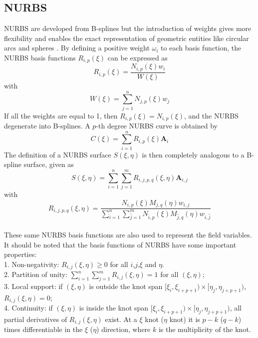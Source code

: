 \documentclass[review]{elsarticle}
\begin{document}
\subsection{NURBS}
NURBS are developed from B-splines but the introduction of weights gives more flexibility and enables the exact representation of geometric entities like circular arcs and spheres \cite{Piegl}. By defining a positive weight $\omega_i$ to each basis function, the NURBS basis functions $R_{i,p}(\xi)$ can be expressed as
\begin{equation}
R_{i,p}(\xi)=\frac{N_{i,p}(\xi)w_i}{W(\xi)} 
\end{equation}
with
\begin{equation}
W(\xi)=\sum_{j=1}^{n}N_{j,p}(\xi)w_j
\end{equation}
If all the weights are equal to 1, then $R_{i,p}(\xi)=N_{i,p}(\xi)$, and the NURBS degenerate into B-splines. A $p$-th degree NURBS curve is obtained by
\begin{equation}
C(\xi)=\sum_{i=1}^{n}R_{i,p}(\xi)\mathbf{A}_i
\end{equation}
The definition of a NURBS surface $S(\xi,\eta)$ is then completely analogous to a B-spline surface, given as
\begin{equation}
S(\xi,\eta)=\sum_{i=1}^{n}\sum_{j=1}^{m}R_{i,j,p,q}(\xi,\eta)\mathbf{A}_{i,j}
\end{equation}
with
\begin{equation}
R_{i,j,p,q}(\xi,\eta)=\frac{N_{i,p}(\xi)M_{j,q}(\eta)w_{i,j}}{\sum_{\hat{i}=1}^{n}\sum_{\hat{j}=1}^{m}N_{\hat{i},p}(\xi)M_{\hat{j},q}(\eta)w_{\hat{i},\hat{j}}}
\end{equation}
\\These same NURBS basis functions are also used to represent the field variables. 
It should be noted that the basis functions of NURBS have some important properties:\\
1. Non-negativity: $R_{i,j}(\xi,\eta)\geq0$ for all $i$,$j$,$\xi$ and $\eta$.\\
2. Partition of unity: $\sum_{i=1}^{n}\sum_{j=1}^{m}R_{i,j}(\xi,\eta)=1$ for all $(\xi,\eta)$;\\
3. Local support: if $(\xi,\eta)$ is outside the knot span $[\xi_i,\xi_{i+p+1}) \times [\eta_j,\eta_{j+p+1})$, $R_{i,j}(\xi,\eta)= 0$;\\
4. Continuity: if $(\xi,\eta)$ is inside the knot span $[\xi_i,\xi_{i+p+1}) \times [\eta_j,\eta_{j+p+1})$, all partial derivatives of $R_{i,j}(\xi,\eta)$ exist. At a $\xi$ knot ($\eta$ knot) it is $p-k$ ($q-k$) times differentiable in the $\xi$ ($\eta$) direction, where $k$ is the multiplicity of the knot.
\end{document}

